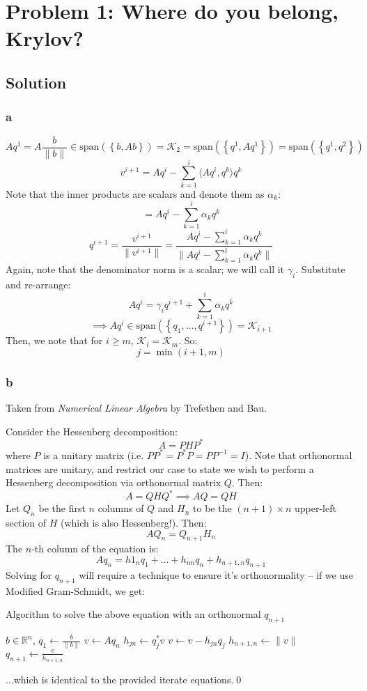 \documentclass[11pt]{report}
\theoremstyle{definition}
\begin{document}
\section*{Problem 1: Where do you belong, Krylov?}
\subsection*{Solution}

\subsubsection*{a}
\[
	Aq^1
	= A\frac{b}{\|b\|}
	\in \mathrm{span}(\left\{b, Ab\right\})
	= \mathcal{K}_2
	= \mathrm{span}(\left\{q^1, Aq^1\right\})
	= \mathrm{span}(\left\{q^1, q^2\right\})
\]
\[ v^{i+1} = Aq^i - \sum_{k=1}^{i}\langle Aq^i,q^k\rangle q^k \]
Note that the inner products are scalars and denote them as $\alpha_k$:
\[  = Aq^i - \sum_{k=1}^{i}\alpha_k q^k \]
\[q^{i+1} = \frac{v^{i+1}}{\|v^{i+1}\|} = \frac{Aq^i - \sum_{k=1}^{i}\alpha_kq^k}{\|Aq^i - \sum_{k=1}^{i}\alpha_kq^k\|}\]
Again, note that the denominator norm is a scalar; we will call it $\gamma_i$. Substitute and re-arrange:
\[ Aq^i = \gamma_i q^{i+1} + \sum_{k=1}^{i}\alpha_kq^k \]
\[\implies Aq^{i} \in \mathrm{span}(\left\{q_1,\ldots, q^{i+1}\right\}) = \mathcal{K}_{i+1}\]
Then, we note that for $i\geq m$, $\mathcal{K}_{i} = \mathcal{K}_{m}$. So:
\[ j = \min(i+1, m) \]

\subsubsection*{b}
Taken from \textit{Numerical Linear Algebra} by Trefethen and Bau.

Consider the Hessenberg decomposition:
\[A = PHP^*\]
where $P$ is a unitary matrix (i.e. $PP^*=P^*P=PP^{-1}=I$). Note that orthonormal matrices are unitary,
and restrict our case to state we wish to perform a Hessenberg decomposition via orthonormal matrix $Q$. Then:
\[A = QHQ^* \implies AQ = QH\]
Let $Q_n$ be the first $n$ columns of $Q$ and $H_n$ to be the $(n+1)\times n$ upper-left section of $H$ (which
is also Hessenberg!). Then:
\[AQ_n = Q_{n+1}H_n\]
The $n$-th column of the equation is:
\[Aq_n = h1_nq_1+\ldots+h_{nn}q_n+h_{n+1,n}q_{n+1}\]
Solving for $q_{n+1}$ will require a technique to ensure it's orthonormality -- if we use Modified Gram-Schmidt,
we get:
\begin{algorithm}[H]
	\caption{Algorithm to solve the above equation with an orthonormal $q_{n+1}$}
	\begin{algorithmic}
		\STATE $b \in \mathbb{R}^{n}$, $q_1 \gets \frac{b}{\|b\|}$
		\STATE $v\gets Aq_n$
		\STATE $h_{jn}\gets q^*_jv$
		\STATE $v \gets v - h_{jn}q_{j}$
		\ENDFOR
		\STATE $h_{n+1,n}\gets \|v\|$
		\STATE $q_{n+1}\gets \frac{v}{h_{n+1,n}}$
		\ENDFOR
	\end{algorithmic}
\end{algorithm}
...which is identical to the provided iterate equations.\qed
\end{document}
